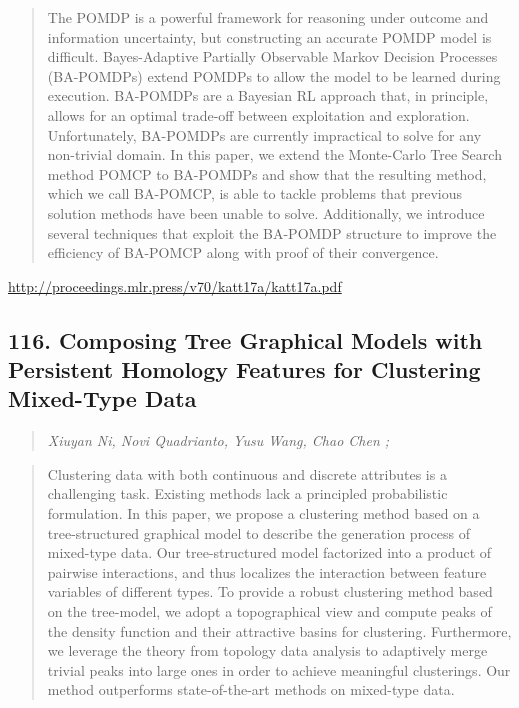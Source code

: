 \documentclass{article}
\begin{document}
\begin{quote}
    The POMDP is a powerful framework for reasoning under outcome and information uncertainty, but constructing an accurate POMDP model is difficult. Bayes-Adaptive Partially Observable Markov Decision Processes (BA-POMDPs) extend POMDPs to allow the model to be learned during execution. BA-POMDPs are a Bayesian RL approach that, in principle, allows for an optimal trade-off between exploitation and exploration. Unfortunately, BA-POMDPs are currently impractical to solve for any non-trivial domain. In this paper, we extend the Monte-Carlo Tree Search method POMCP to BA-POMDPs and show that the resulting method, which we call BA-POMCP, is able to tackle problems that previous solution methods have been unable to solve. Additionally, we introduce several techniques that exploit the BA-POMDP structure to improve the efficiency of BA-POMCP along with proof of their convergence.  
\end{quote}

\href{http://proceedings.mlr.press/v70/katt17a/katt17a.pdf}{http://proceedings.mlr.press/v70/katt17a/katt17a.pdf}

\subsection{116. Composing Tree Graphical Models with Persistent Homology Features for Clustering Mixed-Type Data}

\begin{quote}
\footnotesize{\textit{Xiuyan Ni, Novi Quadrianto, Yusu Wang, Chao Chen ;}}

\end{quote}

\begin{quote}
    Clustering data with both continuous and discrete attributes is a challenging task. Existing methods lack a principled probabilistic formulation. In this paper, we propose a clustering method based on a tree-structured graphical model to describe the generation process of mixed-type data. Our tree-structured model factorized into a product of pairwise interactions, and thus localizes the interaction between feature variables of different types. To provide a robust clustering method based on the tree-model, we adopt a topographical view and compute peaks of the density function and their attractive basins for clustering. Furthermore, we leverage the theory from topology data analysis to adaptively merge trivial peaks into large ones in order to achieve meaningful clusterings. Our method outperforms state-of-the-art methods on mixed-type data.  
\end{quote}
\end{document}
